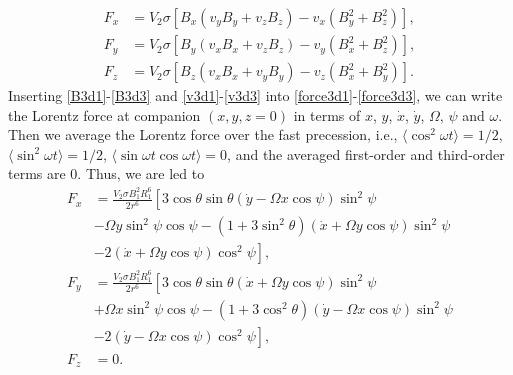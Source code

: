 \documentclass[twocolumn,linenumbers]{aastex631}
\begin{document}
\begin{align}
F_x & =V_2\sigma\left[B_x(v_yB_y+v_zB_z)-v_x(B_y^2+B_z^2)\right], \label{force3d1} \\
F_y & =V_2\sigma\left[B_y(v_xB_x+v_zB_z)-v_y(B_x^2+B_z^2)\right], \label{force3d2} \\
F_z & =V_2\sigma\left[B_z(v_xB_x+v_yB_y)-v_z(B_x^2+B_y^2)\right]. \label{force3d3}
\end{align}
Inserting \eqref{B3d1}-\eqref{B3d3} and \eqref{v3d1}-\eqref{v3d3} into \eqref{force3d1}-\eqref{force3d3}, we can write the Lorentz force at companion $(x,y,z=0)$ in terms of $x$, $y$, $\dot x$, $\dot y$, $\Omega$, $\psi$ and $\omega$. Then we average the Lorentz force over the fast precession, i.e., $\langle\cos^2\omega t\rangle=1/2$, $\langle\sin^2\omega t\rangle=1/2$, $\langle\sin\omega t\cos\omega t\rangle=0$, and the averaged first-order and third-order terms are 0. Thus, we are led to 
\begin{align}
F_x & = \frac{V_2\sigma B_1^2R_1^6}{2r^6} \left[ 3\cos\theta\sin\theta(\dot y-\Omega x\cos\psi)\sin^2\psi \right. \nonumber \\
& -\Omega y\sin^2\psi\cos\psi - (1+3\sin^2\theta)(\dot x+\Omega y\cos\psi)\sin^2\psi \nonumber \\
& \left. -2(\dot x+\Omega y\cos\psi)\cos^2\psi \right] , \label{averaged-force-1} \\
F_y & = \frac{V_2\sigma B_1^2R_1^6}{2r^6} \left[ 3\cos\theta\sin\theta(\dot x+\Omega y\cos\psi)\sin^2\psi \right. \nonumber \\
& +\Omega x\sin^2\psi\cos\psi - (1+3\cos^2\theta)(\dot y-\Omega x\cos\psi)\sin^2\psi \nonumber \\
& \left. -2(\dot y-\Omega x\cos\psi)\cos^2\psi \right], \label{averaged-force-2} \\
F_z & = 0. \label{averaged-force-3}
\end{align}
\end{document}
